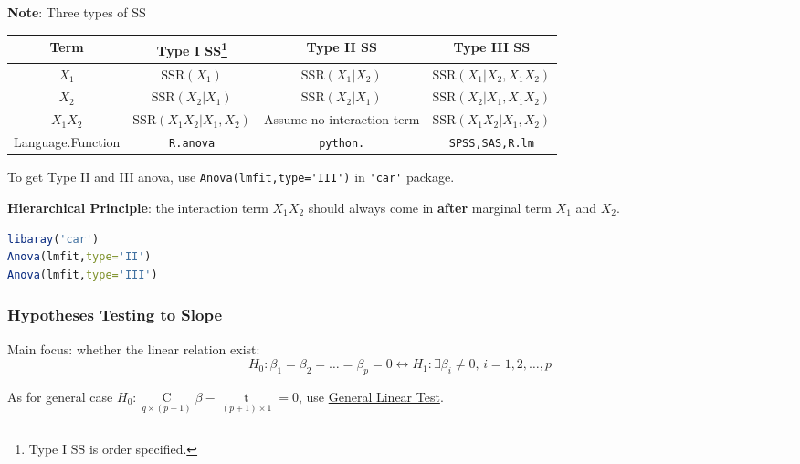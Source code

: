     \textbf{Note}: Three types of SS 
\begin{table}[H]
    \centering
    \renewcommand\arraystretch{1.15}
    \begin{tabular}{c|ccc}
        \hline
        Term&Type I SS\footnote{Type I SS is order specified.}&Type II SS&Type III SS\\\hline
        $ X_1 $&$ \mathrm{SSR}(X_1) $&$ \mathrm{SSR}(X_1|X_2)  $&$ \mathrm{SSR}(X_1|X_2,X_1X_2)  $\\
        $ X_2 $&$ \mathrm{SSR}(X_2|X_1) $&$ \mathrm{SSR}(X_2|X_1)  $&$ \mathrm{SSR}(X_2|X_1,X_1X_2)  $\\
        $ X_1X_2 $&$ \mathrm{SSR}(X_1X_2|X_1,X_2) $&Assume no interaction term &$ \mathrm{SSR}(X_1X_2|X_1,X_2)  $\\\hline
        Language.Function&\lstinline|R.anova|&\lstinline|python.|&\lstinline|SPSS,SAS,R.lm|\\
        \hline
    \end{tabular}
\end{table}

    To get Type II and III anova, use \lstinline|Anova(lmfit,type='III')| in \lstinline|'car'| package.

    \textbf{Hierarchical Principle}: the interaction term $ X_1X_2 $ should always come in \textbf{after}  marginal term $ X_1 $ and $ X_2 $.  

\begin{rcode}
\begin{lstlisting}[language=R]
libaray('car')
Anova(lmfit,type='II')
Anova(lmfit,type='III')
\end{lstlisting}
\end{rcode}






\subsubsection{Hypotheses Testing to Slope}
    Main focus: whether the linear relation exist:
\begin{equation}
    H_0:\beta _1=\beta _2=\ldots=\beta _p=0\longleftrightarrow H_1:\exists \beta _i\neq 0,\, i=1,2,\ldots,p
\end{equation}

    As for general case $ H_0:\mathop{C}\limits_{q\times (p+1)} \beta -\mathop{t}\limits_{(p+1)\times 1}  = 0$, use \hyperlink{HyperlinkGLT}{General Linear Test}.

